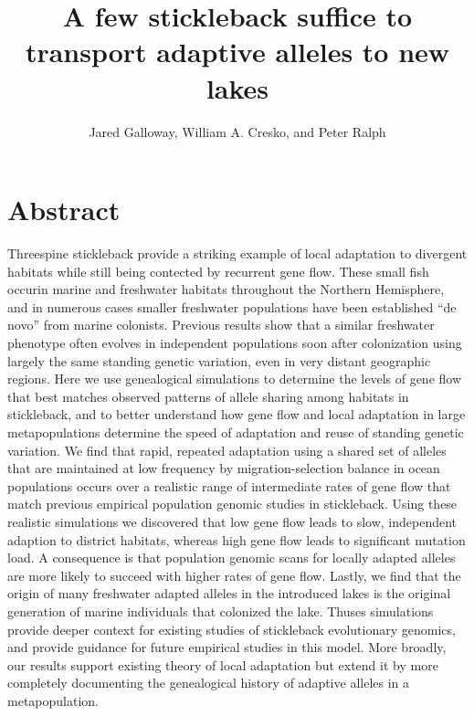 \documentclass{article}
\begin{document}
\title{A few stickleback suffice to transport adaptive alleles to new lakes}
\author{Jared Galloway, William A. Cresko, and Peter Ralph}
\maketitle


\section*{Abstract}

Threespine stickleback provide a striking example of local adaptation to divergent habitats while still being contected by recurrent gene flow. These small fish occurin marine and freshwater habitats throughout the Northern Hemisphere, and in numerous cases smaller freshwater populations have been established ``de novo'' from marine colonists. Previous results show that a similar freshwater phenotype often evolves in independent populations soon after colonization using largely the same standing genetic variation, even in very distant geographic regions. Here we use genealogical simulations to determine the levels of gene flow that best matches observed patterns of allele sharing among habitats in stickleback, and to better understand how gene flow and local adaptation in large metapopulations determine the speed of adaptation and reuse of standing genetic variation. We find that rapid, repeated adaptation using a shared set of alleles that are maintained at low frequency by migration-selection balance in ocean populations occurs over a realistic range of intermediate rates of gene flow that match previous empirical population genomic studies in stickleback. Using these realistic simulations we discovered that low gene flow leads to slow, independent adaption to district habitats, whereas high gene flow leads to significant mutation load. A consequence is that population genomic scans for locally adapted alleles are more likely to succeed with higher rates of gene flow. Lastly, we find that the origin of many freshwater adapted alleles in the introduced lakes is the original generation of marine individuals that colonized the lake. Thuses simulations provide deeper context for existing studies of stickleback evolutionary genomics, and provide guidance for future empirical studies in this model. More broadly, our results support existing theory of local adaptation but extend it by more completely documenting the genealogical history of adaptive alleles in a metapopulation.  
\end{document}
